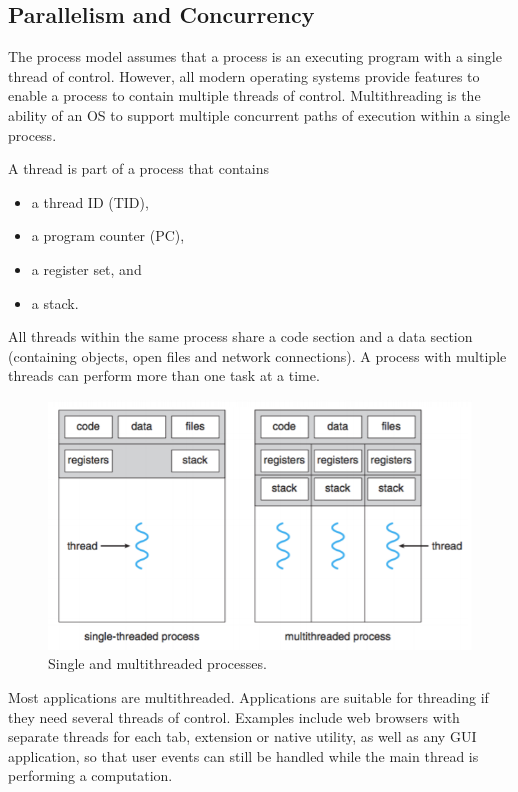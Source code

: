 \subsection{Parallelism and Concurrency}

The process model assumes that a process is an executing program with a single thread of control.
However, all modern operating systems provide features to enable a process to contain multiple threads of control.
Multithreading is the ability of an OS to support multiple concurrent paths of execution within a single process.

A thread is part of a process that contains
\begin{itemize}
  \item a thread ID (TID),
  \item a program counter (PC),
  \item a register set, and
  \item a stack.
\end{itemize}
All threads within the same process share a code section and a data section (containing objects, open files and network connections).
A process with multiple threads can perform more than one task at a time.

\begin{figure}
  \centering
  \includegraphics[width=12cm]{unit-14/figures/multithreading.png}
  \caption*{Single and multithreaded processes.}
\end{figure}

Most applications are multithreaded.
Applications are suitable for threading if they need several threads of control.
Examples include web browsers with separate threads for each tab, extension or native utility, as well as any GUI application, so that user events can still be handled while the main thread is performing a computation.

